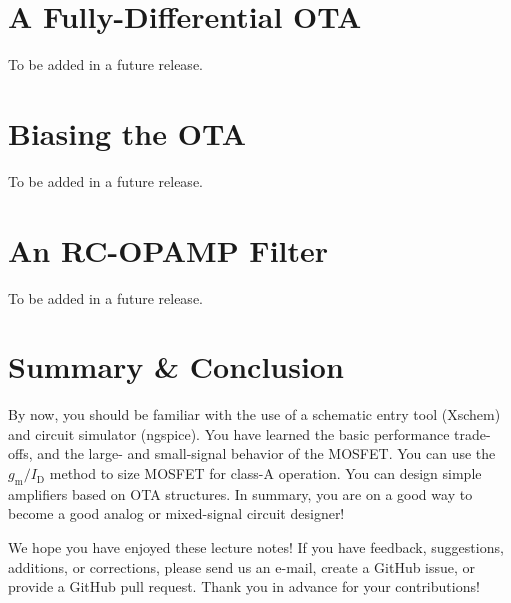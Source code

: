 \documentclass[
  a4paper,
  DIV=11,
  numbers=noendperiod]{scrartcl}
\begin{document}
\section{A Fully-Differential OTA}\label{a-fully-differential-ota}

To be added in a future release.

\section{Biasing the OTA}\label{biasing-the-ota}

To be added in a future release.

\section{An RC-OPAMP Filter}\label{an-rc-opamp-filter}

To be added in a future release.

\section{Summary \& Conclusion}\label{summary-conclusion}

By now, you should be familiar with the use of a schematic entry tool
(Xschem) and circuit simulator (ngspice). You have learned the basic
performance trade-offs, and the large- and small-signal behavior of the
MOSFET. You can use the \(g_\mathrm{m}/I_\mathrm{D}\) method to size
MOSFET for class-A operation. You can design simple amplifiers based on
OTA structures. In summary, you are on a good way to become a good
analog or mixed-signal circuit designer!

\begin{tcolorbox}[enhanced jigsaw, titlerule=0mm, left=2mm, coltitle=black, toprule=.15mm, breakable, opacitybacktitle=0.6, colframe=quarto-callout-important-color-frame, bottomtitle=1mm, toptitle=1mm, opacityback=0, colbacktitle=quarto-callout-important-color!10!white, title=\textcolor{quarto-callout-important-color}{\faExclamation}\hspace{0.5em}{Feedback}, arc=.35mm, rightrule=.15mm, colback=white, bottomrule=.15mm, leftrule=.75mm]

We hope you have enjoyed these lecture notes! If you have feedback,
suggestions, additions, or corrections, please send us an e-mail, create
a GitHub issue, or provide a GitHub pull request. Thank you in advance
for your contributions!

\end{tcolorbox}
\end{document}
